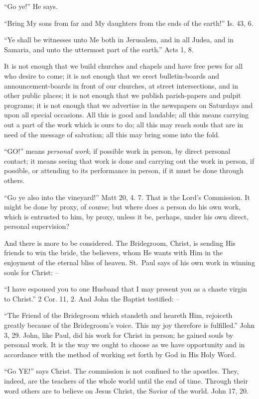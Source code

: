 \documentclass[
]{book}
\begin{document}
``Go ye!'' He says.

``Bring My sons from far and My daughters from the ends of the earth!'' Is. 43, 6.

``Ye shall be witnesses unto Me both in Jerusalem, and in all Judea, and in Samaria, and unto the uttermost part of the earth.'' Acts 1, 8.

It is not enough that we build churches and chapels and have free pews for all who desire to come; it is not enough that we erect bulletin-boards and announcement-boards in front of our churches, at street intersections, and in other public places; it is not enough that we publish parish-papers and pulpit programs; it is not enough that we advertise in the newspapers on Saturdays and upon all special occasions. All this is good and laudable; all this means carrying out a part of the work which is ours to do; all this may reach souls that are in need of the message of salvation; all this may bring some into the fold.

``GO!'' means \emph{personal work}, if possible work in person, by direct personal contact; it means seeing that work is done and carrying out the work in person, if possible, or attending to its performance in person, if it must be done through others.

``Go ye also into the vineyard!'' Matt 20, 4. 7. That is the Lord's Commission. It might be done by proxy, of course; but where does a person do his own work, which is entrusted to him, by proxy, unless it be, perhaps, under his own direct, personal supervision?

And there is more to be considered. The Bridegroom, Christ, is sending His friends to win the bride, the believers, whom He wants with Him in the enjoyment of the eternal bliss of heaven. St.~Paul says of his own work in winning souls for Christ: --

``I have espoused you to one Husband that I may present you as a chaste virgin to Christ.'' 2 Cor. 11, 2. And John the Baptist testified: --

``The Friend of the Bridegroom which standeth and heareth Him, rejoiceth greatly because of the Bridegroom's voice. This my joy therefore is fulfilled.'' John 3, 29. John, like Paul, did his work for Christ in person; he gained souls by personal work. It is the way we ought to choose as we have opportunity and in accordance with the method of working set forth by God in His Holy Word.

``Go YE!'' says Christ. The commission is not confined to the apostles. They, indeed, are the teachers of the whole world until the end of time. Through their word others are to believe on Jesus Christ, the Savior of the world. John 17, 20.
\end{document}
